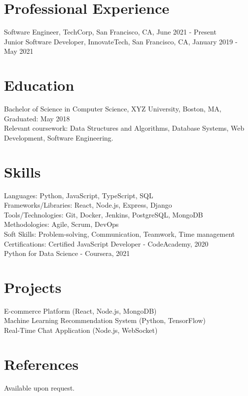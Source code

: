 \documentclass[12pt]{article}
\begin{document}

\section{Professional Experience}
Software Engineer, TechCorp, San Francisco, CA, June 2021 - Present\\
Junior Software Developer, InnovateTech, San Francisco, CA, January 2019 - May 2021

\section{Education}
Bachelor of Science in Computer Science, XYZ University, Boston, MA, Graduated: May 2018\\
Relevant coursework: Data Structures and Algorithms, Database Systems, Web Development, Software Engineering.

\section{Skills}
Languages: Python, JavaScript, TypeScript, SQL\\
Frameworks/Libraries: React, Node.js, Express, Django\\
Tools/Technologies: Git, Docker, Jenkins, PostgreSQL, MongoDB\\
Methodologies: Agile, Scrum, DevOps\\
Soft Skills: Problem-solving, Communication, Teamwork, Time management\\
Certifications: Certified JavaScript Developer - CodeAcademy, 2020\\
Python for Data Science - Coursera, 2021\\

\section{Projects}
E-commerce Platform (React, Node.js, MongoDB)\\
Machine Learning Recommendation System (Python, TensorFlow)\\
Real-Time Chat Application (Node.js, WebSocket)

\section{References}
Available upon request.
\end{document}
